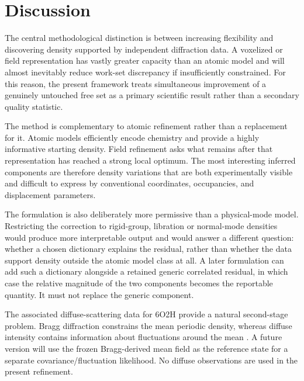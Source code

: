 \documentclass[11pt]{article}
\begin{document}
\section{Discussion}
The central methodological distinction is between increasing flexibility and discovering density supported by independent diffraction data. A voxelized or field representation has vastly greater capacity than an atomic model and will almost inevitably reduce work-set discrepancy if insufficiently constrained. For this reason, the present framework treats simultaneous improvement of a genuinely untouched free set as a primary scientific result rather than a secondary quality statistic.

The method is complementary to atomic refinement rather than a replacement for it. Atomic models efficiently encode chemistry and provide a highly informative starting density. Field refinement asks what remains after that representation has reached a strong local optimum. The most interesting inferred components are therefore density variations that are both experimentally visible and difficult to express by conventional coordinates, occupancies, and displacement parameters.

The formulation is also deliberately more permissive than a physical-mode model. Restricting the correction to rigid-group, libration or normal-mode densities would produce more interpretable output and would answer a different question: whether a chosen dictionary explains the residual, rather than whether the data support density outside the atomic model class at all. A later formulation can add such a dictionary alongside a retained generic correlated residual, in which case the relative magnitude of the two components becomes the reportable quantity. It must not replace the generic component.

The associated diffuse-scattering data for 6O2H provide a natural second-stage problem. Bragg diffraction constrains the mean periodic density, whereas diffuse intensity contains information about fluctuations around the mean \cite{meisburger2020}. A future version will use the frozen Bragg-derived mean field as the reference state for a separate covariance/fluctuation likelihood. No diffuse observations are used in the present refinement.
\end{document}
